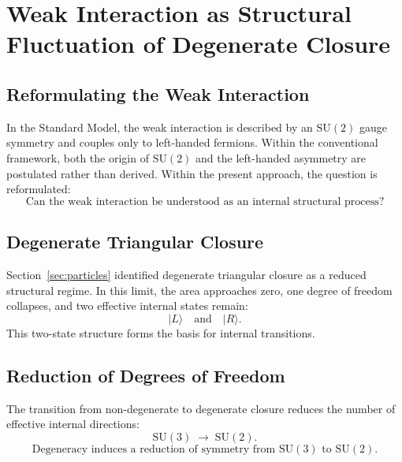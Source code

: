 \section{Weak Interaction as Structural Fluctuation of Degenerate Closure}
\label{sec:weak}

\subsection{Reformulating the Weak Interaction}

In the Standard Model, the weak interaction is described by
an $\mathrm{SU}(2)$ gauge symmetry and couples only to left-handed fermions.
Within the conventional framework,
both the origin of $\mathrm{SU}(2)$ and the left-handed asymmetry
are postulated rather than derived.
Within the present approach, the question is reformulated:
\begin{equation}
  \boxed{
    \text{Can the weak interaction be understood as an internal
    structural process?}
  }
\end{equation}

\subsection{Degenerate Triangular Closure}

Section~\ref{sec:particles} identified degenerate triangular closure
as a reduced structural regime.
In this limit, the area approaches zero,
one degree of freedom collapses,
and two effective internal states remain:
\begin{equation}
  \boxed{|L\rangle \quad \text{and} \quad |R\rangle.}
\end{equation}
This two-state structure forms the basis for internal transitions.

\subsection{Reduction of Degrees of Freedom}

The transition from non-degenerate to degenerate closure
reduces the number of effective internal directions:
\begin{equation}
  \mathrm{SU}(3) \;\longrightarrow\; \mathrm{SU}(2).
\end{equation}
\begin{equation}
  \boxed{
    \text{Degeneracy induces a reduction of symmetry from }
    \mathrm{SU}(3) \text{ to } \mathrm{SU}(2).
  }
\end{equation}

